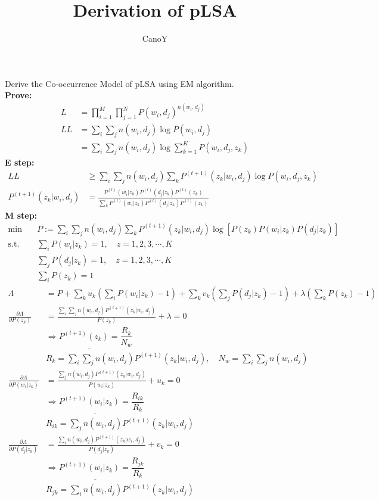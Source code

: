 \documentclass{paper}
\title{Derivation of pLSA}
\author{CanoY}
\begin{document}
\maketitle
Derive the Co-occurrence Model of pLSA using EM algorithm.\\
\textbf{Prove:}
    \begin{align*}
        L&=\prod\limits_{i=1}^M \prod\limits_{j=1}^N P(w_i, d_j)^{n(w_i,d_j)}\\
        LL&=\sum_i \sum_j n(w_i,d_j)\log P(w_i,d_j)\\
        &=\sum_i \sum_j n(w_i,d_j)\log \sum\limits_{k=1}^K P(w_i,d_j,z_k)
    \end{align*}
\textbf{E step:}
    \begin{align*}
        LL&\geq \sum_i \sum_j n(w_i,d_j) \sum_k P^{(t+1)}(z_k\vert w_i,d_j) \log P(w_i,d_j,z_k)\\
        P^{(t+1)}(z_k\vert w_i,d_j) &= \frac{
                P^{(t)}(w_i\vert z_k) P^{(t)}(d_j\vert z_k) P^{(t)}(z_k)
            }{
                \sum_k P^{(t)}(w_i\vert z_k) P^{(t)}(d_j\vert z_k) P^{(t)}(z_k)
            }
    \end{align*}
\textbf{M step:}
    \begin{align*}
        \min\quad&P:=\sum_i \sum_j n(w_i,d_j) \sum_k P^{(t+1)}(z_k\vert w_i,d_j) \log [P(z_k) P(w_i\vert z_k) P(d_j\vert z_k)]\\
        \text{s.t.}\quad&\sum_i P(w_i\vert z_k)=1,\quad z=1,2,3,\cdots,K\\
        \quad&\sum_j P(d_j\vert z_k)=1,\quad z=1,2,3,\cdots,K\\
        \quad&\sum_i P(z_k)=1
    \end{align*}
    \begin{align*}
        \Lambda &= P + \sum_k u_k(\sum_i P(w_i\vert z_k)-1) +
        \sum_k v_k(\sum_j P(d_j\vert z_k)-1) +
        \lambda(\sum_k P(z_k)-1)\\
        \frac{\partial \Lambda}{\partial P(z_k)} &=\frac{\sum_i\sum_j n(w_i,d_j)P^{(t+1)}(z_k\vert w_i,d_j)}{P(z_k)}+\lambda = 0\\
        & \underline{\Rightarrow P^{(t+1)}(z_k) = \dfrac{R_k}{N_w}}\\
        & R_k = \sum_i\sum_j n(w_i,d_j)P^{(t+1)}(z_k\vert w_i,d_j), \quad N_w =\sum_i\sum_j n(w_i,d_j)\\
        \frac{\partial \Lambda}{\partial P(w_i\vert z_k)}&=\frac{\sum_j n(w_i,d_j)P^{(t+1)}(z_k\vert w_i,d_j)}{P(w_i\vert z_k)}+u_k=0\\
        & \underline{\Rightarrow P^{(t+1)}(w_i\vert z_k) = \dfrac{R_{ik}}{R_k}}\\
        & R_{ik} = \sum_j n(w_i,d_j)P^{(t+1)}(z_k\vert w_i,d_j)\\
        \frac{\partial \Lambda}{\partial P(d_j\vert z_k)}&=\frac{\sum_i n(w_i,d_j)P^{(t+1)}(z_k\vert w_i,d_j)}{P(d_j\vert z_k)}+v_k=0\\
        & \underline{\Rightarrow P^{(t+1)}(w_i\vert z_k) = \dfrac{R_{jk}}{R_k}}\\
        & R_{jk} = \sum_i n(w_i,d_j)P^{(t+1)}(z_k\vert w_i,d_j)
    \end{align*}
\end{document}
